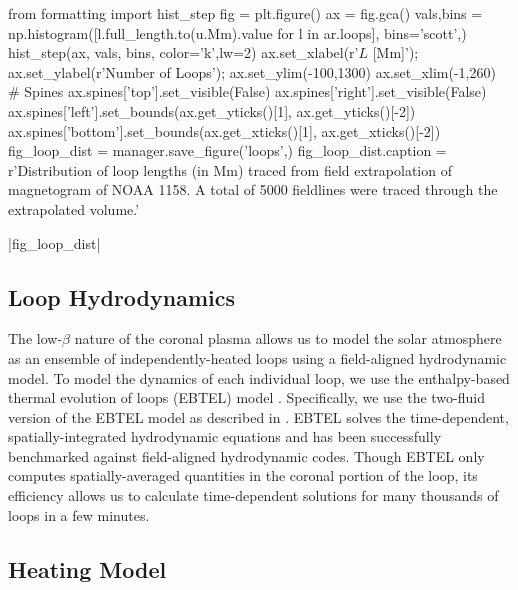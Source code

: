 \begin{pycode}[manager]
from formatting import hist_step
fig = plt.figure()
ax = fig.gca()
vals,bins = np.histogram([l.full_length.to(u.Mm).value for l in ar.loops], bins='scott',)
hist_step(ax, vals, bins, color='k',lw=2)
ax.set_xlabel(r'$L$ [Mm]');
ax.set_ylabel(r'Number of Loops');
ax.set_ylim(-100,1300)
ax.set_xlim(-1,260)
# Spines
ax.spines['top'].set_visible(False)
ax.spines['right'].set_visible(False)
ax.spines['left'].set_bounds(ax.get_yticks()[1], ax.get_yticks()[-2])
ax.spines['bottom'].set_bounds(ax.get_xticks()[1], ax.get_xticks()[-2])
fig_loop_dist = manager.save_figure('loops',)
fig_loop_dist.caption = r'Distribution of loop lengths (in Mm) traced from field extrapolation of magnetogram of NOAA 1158. A total of 5000 fieldlines were traced through the extrapolated volume.'
\end{pycode}
\py[manager]|fig_loop_dist|

\subsection{Loop Hydrodynamics}\label{loops}

The low-$\beta$ nature of the coronal plasma allows us to model the solar atmosphere as an ensemble of independently-heated loops using a field-aligned hydrodynamic model. To model the dynamics of each individual loop, we use the enthalpy-based thermal evolution of loops (EBTEL) model \citep{klimchuk_highly_2008,cargill_enthalpy-based_2012}. Specifically, we use the two-fluid version of the EBTEL model as described in \citep{barnes_inference_2016}. EBTEL solves the time-dependent, spatially-integrated hydrodynamic equations and has been successfully benchmarked against field-aligned hydrodynamic codes. Though EBTEL only computes spatially-averaged quantities in the coronal portion of the loop, its efficiency allows us to calculate time-dependent solutions for many thousands of loops in a few minutes.

\subsection{Heating Model}\label{heating}

